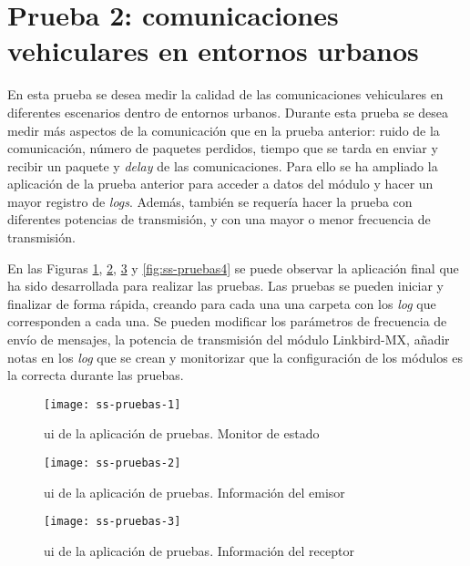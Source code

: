 \section{Prueba 2: comunicaciones vehiculares en entornos urbanos}
En esta prueba se desea medir la calidad de las comunicaciones vehiculares en
diferentes escenarios dentro de entornos urbanos. Durante esta prueba se desea
medir más aspectos de la comunicación que en la prueba anterior: ruido de la
comunicación, número de paquetes perdidos, tiempo que se tarda en enviar y
recibir un paquete y \emph{delay} de las comunicaciones. Para ello se ha
ampliado la aplicación de la prueba anterior para acceder a datos del módulo y
hacer un mayor registro de \emph{logs}. Además, también se requería hacer la
prueba con diferentes potencias de transmisión, y con una mayor o menor
frecuencia de transmisión.

En las Figuras \ref{fig:ss-pruebas1}, \ref{fig:ss-pruebas2},
\ref{fig:ss-pruebas3} y \ref{fig:ss-pruebas4} se puede observar la aplicación
final que ha sido desarrollada para realizar las pruebas. Las pruebas se pueden
iniciar y finalizar de forma rápida, creando para cada una una carpeta con los
\emph{log} que corresponden a cada una. Se pueden modificar los parámetros de
frecuencia de envío de mensajes, la potencia de transmisión del módulo
Linkbird-MX, añadir notas en los \emph{log} que se crean y monitorizar que la
configuración de los módulos es la correcta durante las pruebas.

\begin{figure}[H]
	\begin{center}
		\texttt{[image: ss-pruebas-1]}
		\caption{\gls{ui} de la aplicación de pruebas. Monitor de estado}
		\label{fig:ss-pruebas1}
	\end{center}
\end{figure}

\begin{figure}[H]
	\begin{center}
		\texttt{[image: ss-pruebas-2]}
		\caption{\gls{ui} de la aplicación de pruebas. Información del emisor}
		\label{fig:ss-pruebas2}
	\end{center}
\end{figure}

\begin{figure}[H]
	\begin{center}
		\texttt{[image: ss-pruebas-3]}
		\caption{\gls{ui} de la aplicación de pruebas. Información del receptor}
		\label{fig:ss-pruebas3}
	\end{center}
\end{figure}

